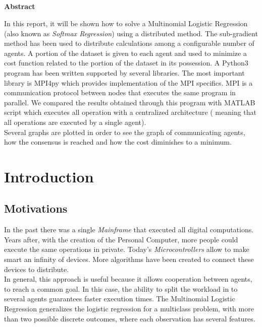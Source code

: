\documentclass[a4paper,11pt,oneside]{book}
\begin{document}
\pagestyle{myheadings}



\newpage
\thispagestyle{empty}

\begin{center}
\chapter*{}
\thispagestyle{empty}
{\Huge \textbf{Abstract}}\\
\vspace{15mm}
\end{center}
In this report, it will be shown how to solve a Multinomial Logistic Regression (also known as \textit{Softmax Regression}) using a distributed method. The sub-gradient method has been used to distribute calculations among a configurable number of agents. A portion of the dataset is given to each agent and used to minimize a cost function related to the portion of the dataset in its possession.
A Python3 program has been written supported by several libraries. The most important library is MPI4py which provides implementation of the MPI specifics. MPI is a communication protocol between nodes that executes the same program in parallel. We compared the results obtained through this program with MATLAB script which executes all operation with  a centralized architecture ( meaning that all operations are executed by a single agent).\\
Several graphs are plotted in order to see the graph of communicating agents, how the consensus is reached and how the cost diminishes to a minimum.


\tableofcontents \thispagestyle{empty}
\listoffigures\thispagestyle{empty}

\chapter*{Introduction}

\section*{Motivations}
In the past there was a single \textit{Mainframe} that executed all digital computations. Years after, with the creation of the Personal Computer, more people could execute the same operations in private. Today's \textit{Microcontrollers} allow to make smart an infinity of devices. More algorithms have been created to connect these devices to distribute.\\
 In general, this approach is useful because it allows cooperation between agents, to reach a common goal. In this case, the ability to split the workload in to several agents guarantees faster execution times.
The Multinomial Logistic Regression generalizes the logistic regression for a multiclass problem, with more than two possible discrete outcomes, where each observation has several features.
\end{document}
